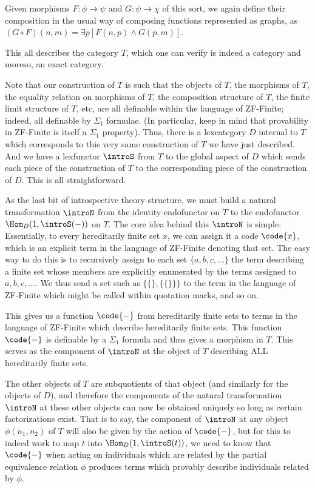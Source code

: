 Given morphisms $F : \phi \to \psi$ and $G: \psi \to \chi$ of this sort, we again define their composition in the usual way of composing functions represented as graphs, as $(G \circ F)(n, m) = \exists p [F(n, p) \wedge G(p, m)]$.

This all describes the category $T$, which one can verify is indeed a category and moreso, an exact category.

Note that our construction of $T$ is such that the objects of $T$, the morphisms of $T$, the equality relation on morphisms of $T$, the composition structure of $T$, the finite limit structure of $T$, etc, are all definable within the language of ZF-Finite; indeed, all definable by $\Sigma_1$ formulae. (In particular, keep in mind that provability in ZF-Finite is itself a $\Sigma_1$ property). Thus, there is a lexcategory $D$ internal to $T$ which corresponds to this very same construction of $T$ we have just described. And we have a lexfunctor $\introS$ from $T$ to the global aspect of $D$ which sends each piece of the construction of $T$ to the corresponding piece of the construction of $D$. This is all straightforward.

As the last bit of introspective theory structure, we must build a natural transformation $\introN$ from the identity endofunctor on $T$ to the endofunctor $\Hom_D(1, \introS(-))$ on $T$. The core idea behind this $\introN$ is simple. Essentially, to every hereditarily finite set $x$, we can assign it a code $\code{x}$, which is an explicit term in the language of ZF-Finite denoting that set. The easy way to do this is to recursively assign to each set $\{a, b, c, \ldots\}$ the term describing a finite set whose members are explicitly enumerated by the terms assigned to $a, b, c, \ldots$. We thus send a set such as $\{\{\}, \{\{\}\}\}$ to the term in the language of ZF-Finite which might be called \quote{$\{\{\}, \{\{\}\}\}$} within quotation marks, and so on.

This gives us a function $\code{-}$ from hereditarily finite sets to terms in the language of ZF-Finite which describe hereditarily finite sets. This function $\code{-}$ is definable by a $\Sigma_1$ formula and thus gives a morphism in $T$. This serves as the component of $\introN$ at the object of $T$ describing ALL hereditarily finite sets. 


The other objects of $T$ are subquotients of that object (and similarly for the objects of $D$), and therefore the components of the natural transformation $\introN$ at these other objects can now be obtained uniquely so long as certain factorizations exist. That is to say, the component of $\introN$ at any object $\phi(n_1, n_2)$ of $T$ will also be given by the action of $\code{-}$, but for this to indeed work to map $t$ into $\Hom_D(1, \introS(t))$, we need to know that $\code{-}$ when acting on individuals which are related by the partial equivalence relation $\phi$ produces terms which provably describe individuals related by $\phi$.

